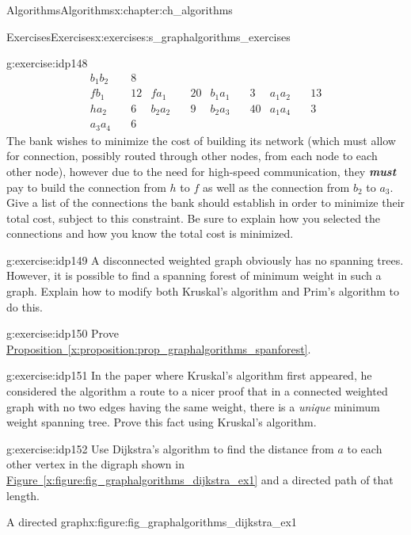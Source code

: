 \documentclass[oneside,10pt,]{book}
\newcommand{\xreffont}{\relax}
\newcommand{\alert}[1]{\textbf{\textit{#1}}}
\numberwithin{equation}{section}
\newcommand{\amp}{&}
\begin{document}
\begin{chapterptx}{Algorithms}{}{Algorithms}{}{}{x:chapter:ch_algorithms}
\begin{exercises-section}{Exercises}{}{Exercises}{}{}{x:exercises:s_graphalgorithms_exercises}
\begin{divisionexercise}{7}{}{}{g:exercise:idp148}
\begin{align*}
b_1 b_2 \amp  \quad 8\\
f b_1 \amp  \quad 12\amp 
f a_1 \amp  \quad 20\amp  b_1 a_1 \amp  \quad 3\amp 
a_1 a_2 \amp  \quad 13\\
h a_2 \amp  \quad 6\amp 
b_2 a_2 \amp  \quad 9\amp  b_2 a_3 \amp  \quad 40\amp 
a_1 a_4 \amp  \quad 3\\
a_3 a_4 \amp \quad 6
\end{align*}
The bank wishes to minimize the cost of building its network (which must allow for connection, possibly routed through other nodes, from each node to each other node), however due to the need for high-speed communication, they \alert{must} pay to build the connection from \(h\) to \(f\) as well as the connection from \(b_2\) to \(a_3\). Give a list of the connections the bank should establish in order to minimize their total cost, subject to this constraint. Be sure to explain how you selected the connections and how you know the total cost is minimized.%
\end{divisionexercise}%
\begin{divisionexercise}{8}{}{}{g:exercise:idp149}%
A disconnected weighted graph obviously has no spanning trees. However, it is possible to find a spanning forest of minimum weight in such a graph. Explain how to modify both Kruskal's algorithm and Prim's algorithm to do this.%
\end{divisionexercise}%
\begin{divisionexercise}{9}{}{}{g:exercise:idp150}%
Prove \hyperref[x:proposition:prop_graphalgorithms_spanforest]{Proposition~{\xreffont\ref{x:proposition:prop_graphalgorithms_spanforest}}}.%
\end{divisionexercise}%
\begin{divisionexercise}{10}{}{}{g:exercise:idp151}%
In the paper where Kruskal's algorithm first appeared, he considered the algorithm a route to a nicer proof that in a connected weighted graph with no two edges having the same weight, there is a \emph{unique} minimum weight spanning tree. Prove this fact using Kruskal's algorithm.%
\end{divisionexercise}%
\begin{divisionexercise}{11}{}{}{g:exercise:idp152}%
Use Dijkstra's algorithm to find the distance from \(a\) to each other vertex in the digraph shown in \hyperref[x:figure:fig_graphalgorithms_dijkstra_ex1]{Figure~{\xreffont\ref{x:figure:fig_graphalgorithms_dijkstra_ex1}}} and a directed path of that length.%
\begin{figureptx}{A directed graph}{x:figure:fig_graphalgorithms_dijkstra_ex1}{}%

\end{figureptx}
\end{divisionexercise}
\end{exercises-section}
\end{chapterptx}
\end{document}
